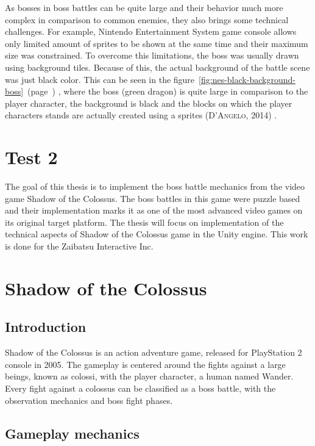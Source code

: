 \documentclass[a4paper]{article}
\newcommand{\reffigure}[1]
{
	figure~\ref{fig:#1}~(page~\pageref{fig:#1})%
}
\newcommand{\specialsection}[1]
{
	\section*{#1}
	\addcontentsline{toc}{section}{\protect\numberline{}#1}
}
\newcommand{\rref}[2]
{
	(\textsc{#1, #2})%
}
\begin{document}
As bosses in boss battles can be quite large and their behavior much more complex in comparison to common enemies, they also brings some technical challenges. For example, Nintendo Entertainment System game console allows only limited amount of sprites to be shown at the same time and their maximum size was constrained. To overcome this limitations, the boss was usually drawn using background tiles. Because of this, the actual background of the battle scene was just black color. This can be seen in the \reffigure{nes-black-background-boss}, where the boss (green dragon) is quite large in comparison to the player character, the background is black and the blocks on which the player characters stands are actually created using a sprites \rref{D'Angelo}{2014}.

\specialsection{Test 2}

The goal of this thesis is to implement the boss battle mechanics from the video game Shadow of the Colossus. The boss battles in this game were puzzle based and their implementation marks it as one of the most advanced video games on its original target platform. The thesis will focus on implementation of the technical aspects of Shadow of the Colossus game in the Unity engine. This work is done for the Zaibatsu Interactive Inc. 

\section{Shadow of the Colossus}

\subsection{Introduction}

Shadow of the Colossus is an action adventure game, released for PlayStation 2 console in 2005. The gameplay is centered around the fights against a large beings, known as colossi, with the player character, a human named Wander. Every fight against a colossus can be classified as a boss battle, with the observation mechanics and boss fight phases.

\subsection{Gameplay mechanics}
\end{document}
